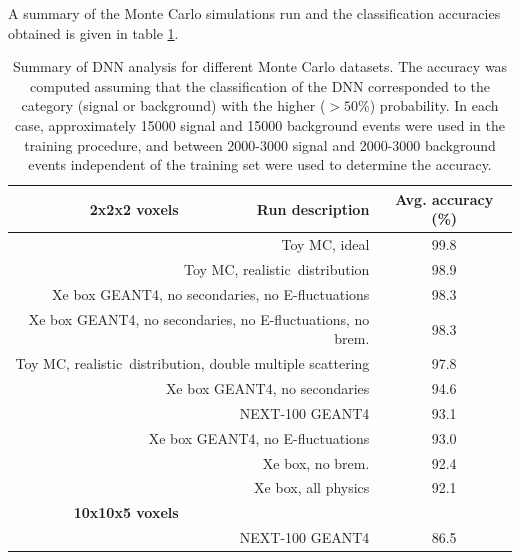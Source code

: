 \documentclass[a4paper,11pt]{article}
\begin{document}
A summary of the Monte Carlo simulations run and the classification accuracies obtained is given in table \ref{tbl.DNNsummary}.  

\begin{table}[!htb]
	\begin{center}
		\caption[DNN analysis summary]{\label{tbl.DNNsummary}Summary of DNN analysis for different Monte Carlo datasets.  The accuracy was computed assuming that the classification
			of the DNN corresponded to the category (signal or background) with the higher ($> 50$\%) probability.  In each case, approximately 15000 signal and 15000 background events were
			used in the training procedure, and between 2000-3000 signal and 2000-3000 background events independent of the training set were used to determine the accuracy.}
		\begin{tabular}{rrc}
			\\
			\textbf{2x2x2 voxels} & \textbf{Run description} & \textbf{Avg. accuracy} (\%)\\
			\hline
			\multicolumn{2}{r}{Toy MC, ideal} & 99.8\\
			\multicolumn{2}{r}{Toy MC, realistic \bbonu\,distribution} & 98.9\\
			\multicolumn{2}{r}{Xe box GEANT4, no secondaries, no E-fluctuations} & 98.3\\
			\multicolumn{2}{r}{Xe box GEANT4, no secondaries, no E-fluctuations, no brem.} & 98.3\\
			\multicolumn{2}{r}{Toy MC, realistic \bbonu\,distribution, double multiple scattering} & 97.8\\
			\multicolumn{2}{r}{Xe box GEANT4, no secondaries} & 94.6\\
			\multicolumn{2}{r}{NEXT-100 GEANT4} & 93.1\\
			\multicolumn{2}{r}{Xe box GEANT4, no E-fluctuations} & 93.0\\
			\multicolumn{2}{r}{Xe box, no brem.} & 92.4\\
			\multicolumn{2}{r}{Xe box, all physics} & 92.1\\
			\textbf{10x10x5 voxels} & & \\
			\hline
			\multicolumn{2}{r}{NEXT-100 GEANT4} & 86.5
		\end{tabular}
	\end{center}
\end{table}

\end{document}
